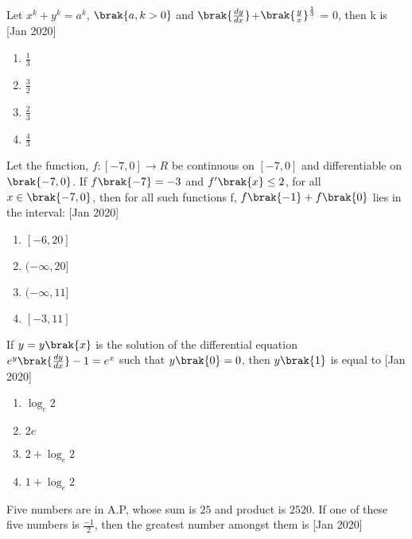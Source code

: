 \iffalse
\title{Assignment}
\author{ee24btech11064}
\section{mcq-single}
\fi

\item Let $x^k + y^k = a^k$, $\brak{a,k>0}$ and $\brak{\frac{dy}{dx}}$+$\brak{\frac{y}{x}}^\frac{1}{3}$ = $0$, then k is \hfill[Jan 2020]
\begin{multicols}{2}
\begin{enumerate}
    \item $\frac{1}{3}$
    \item $\frac{3}{2}$
    \item $\frac{2}{3}$
    \item $\frac{4}{3}$ 
\end{enumerate}
\end{multicols}
\item Let the function, $f:[-7,0]\rightarrow R$ be continuous on $[-7,0]$ and differentiable on $\brak{-7,0}$. If $f\brak{-7}=-3$ and $f'\brak{x} \leq 2$, for all $x \in \brak{-7,0}$, then for all such functions f, $f\brak{-1}+f\brak{0}$ lies in the interval: \hfill[Jan 2020]
\begin{multicols}{2}
\begin{enumerate}
    \item $[-6,20]$
    \item $(-\infty,20]$
    \item $(-\infty,11]$
    \item $[-3,11]$
\end{enumerate}
\end{multicols}
\item If $y = y\brak{x}$ is the solution of the differential equation $e^y\brak{\frac{dy}{dx}}-1=e^x$ such that $y\brak{0}=0$, then $y\brak{1}$ is equal to \hfill[Jan 2020]
\begin{multicols}{2}
\begin{enumerate}
       \item $\log_e2$
       \item $2e$
       \item $2+\log_e2$
       \item $1+\log_e2$
\end{enumerate}
\end{multicols}
\item Five numbers are in A.P, whose sum is $25$ and product is $2520$. If one of these five numbers is $\frac{-1}{2}$, then the greatest number amongst them is \hfill[Jan 2020]
